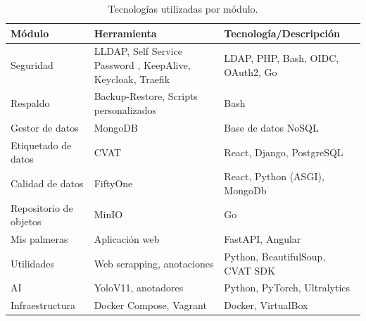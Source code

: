 \begin{table}[ht!]
  \centering
  \caption[Tecnologías utilizadas]{Tecnologías utilizadas por módulo.}
  \begin{tabularx}{\textwidth}{ >{\raggedright\arraybackslash}p{2.5cm} >{\raggedright\arraybackslash}X >{\raggedright\arraybackslash}X }
    \toprule
    \textbf{Módulo}        & \textbf{Herramienta}                                                                       & \textbf{Tecnología/Descripción}                      \\
    \midrule
    Seguridad              & LLDAP, Self Service Password \citep{ltb_project_ldap_nodate}, KeepAlive, Keycloak, Traefik & LDAP, PHP, Bash, OIDC, OAuth2, Go                    \\
    Respaldo               & Backup-Restore, Scripts personalizados                                                     & Bash                                                 \\
    Gestor de datos        & MongoDB                                                                                    & Base de datos NoSQL                                  \\
    Etiquetado de datos    & CVAT                                                                                       & React, Django, PostgreSQL                            \\
    Calidad de datos       & FiftyOne                                                                                   & React, Python (ASGI), MongoDb                        \\
    Repositorio de objetos & MinIO                                                                                      & Go                                                   \\
    Mis palmeras           & Aplicación web                                                                             & FastAPI, Angular                                     \\
    Utilidades             & Web scrapping, anotaciones                                                                 & Python, BeautifulSoup, CVAT SDK                      \\
    AI                     & YoloV11, anotadores                                                                        & Python, PyTorch, Ultralytics                         \\
    Infraestructura        & Docker Compose, Vagrant                                                                    & Docker, VirtualBox \citep{wikipedia_virtualbox_2025} \\
    \bottomrule
    \hline
  \end{tabularx}
  \label{tab:tecnologias}
\end{table}

